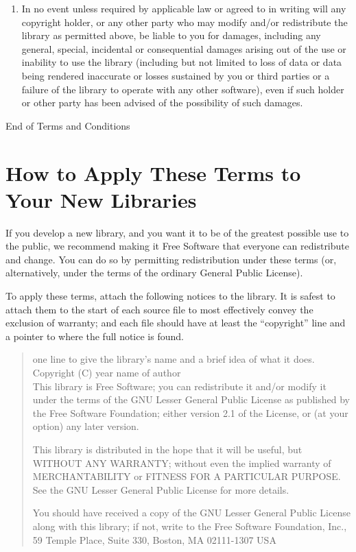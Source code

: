 \documentclass[11pt, letterpaper]{book}
\begin{document}
\begin{enumerate}

\item

{\sc In no event unless required by applicable law or agreed to in writing
  will any copyright holder, or any other party who may modify and/or
  redistribute the library as permitted above, be liable to you for
  damages, including any general, special, incidental or consequential
  damages arising out of the use or inability to use the library
  (including but not limited to loss of data or data being rendered
  inaccurate or losses sustained by you or third parties or a failure of
  the library to operate with any other software), even if such holder or
  other party has been advised of the possibility of such damages.}

\end{enumerate}

\begin{center}
{\Large\sc End of Terms and Conditions}
\end{center}
\vfill

\pagebreak[4]

\section*{How to Apply These Terms to Your New Libraries}
           
If you develop a new library, and you want it to be of the greatest
possible use to the public, we recommend making it Free Software that
everyone can redistribute and change. You can do so by permitting
redistribution under these terms (or, alternatively, under the terms of
the ordinary General Public License).

To apply these terms, attach the following notices to the library. It is
safest to attach them to the start of each source file to most effectively
convey the exclusion of warranty; and each file should have at least the
``copyright'' line and a pointer to where the full notice is found.

\begin{quote}
one line to give the library's name and a brief idea of what it does. \\
Copyright (C) year  name of author \\

This library is Free Software; you can redistribute it and/or modify it
under the terms of the GNU Lesser General Public License as published by
the Free Software Foundation; either version 2.1 of the License, or (at
your option) any later version.

This library is distributed in the hope that it will be useful, but
WITHOUT ANY WARRANTY; without even the implied warranty of MERCHANTABILITY
or FITNESS FOR A PARTICULAR PURPOSE. See the GNU Lesser General Public
License for more details.

You should have received a copy of the GNU Lesser General Public License
along with this library; if not, write to the Free Software Foundation,
Inc., 59 Temple Place, Suite 330, Boston, MA 02111-1307 USA
\end{quote}
\end{document}

